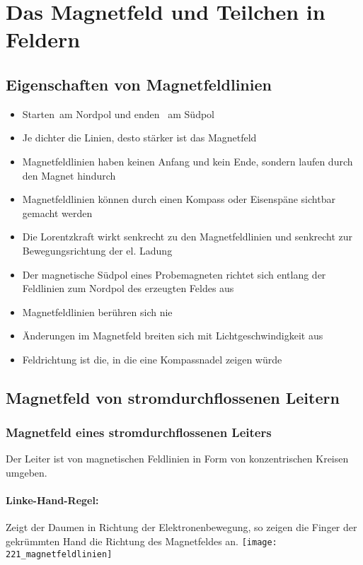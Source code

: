 \section{Das Magnetfeld und Teilchen in Feldern}
\subsection{Eigenschaften von Magnetfeldlinien}
\begin{itemize}
	\item \glqq Starten\grqq\ am Nordpol und \glqq enden	\grqq\ am Südpol
	\item Je dichter die Linien, desto stärker ist das Magnetfeld
	\item Magnetfeldlinien haben keinen Anfang und kein Ende, sondern laufen durch den Magnet hindurch
	\item Magnetfeldlinien können durch einen Kompass oder Eisenspäne sichtbar gemacht werden
	\item Die Lorentzkraft wirkt senkrecht zu den Magnetfeldlinien und senkrecht zur Bewegungsrichtung der el. Ladung
	\item Der magnetische Südpol eines Probemagneten richtet sich entlang der Feldlinien zum Nordpol des erzeugten Feldes aus
	\item Magnetfeldlinien berühren sich nie
	\item Änderungen im Magnetfeld breiten sich mit Lichtgeschwindigkeit aus
	\item Feldrichtung ist die, in die eine Kompassnadel zeigen würde
\end{itemize}

\subsection{Magnetfeld von stromdurchflossenen Leitern}
\subsubsection{Magnetfeld eines stromdurchflossenen Leiters}
Der Leiter ist von magnetischen Feldlinien in Form von konzentrischen Kreisen umgeben. \\
\paragraph{Linke-Hand-Regel:} Zeigt der Daumen in Richtung der Elektronenbewegung, so zeigen die Finger der gekrümmten Hand die Richtung des Magnetfeldes an. 
\texttt{[image: 221\_magnetfeldlinien]}

